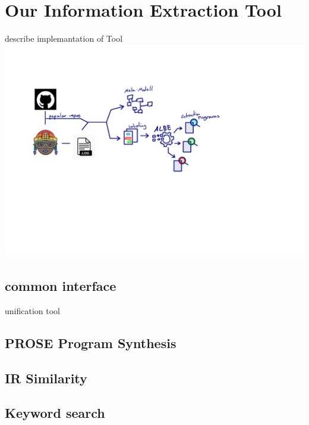 \documentclass[\myrootdir/main.tex]{subfiles}
\begin{document}
\chapter{Our Information Extraction Tool}
\label{implementation}
describe implemantation of Tool
\includegraphics[page=6, width=\textwidth, trim={0.5cm 0.5cm 0.5cm 0.5cm}, clip]{img/flow-of-research.pdf}

\section{common interface} 
unification tool

\section{PROSE Program Synthesis}

\section{IR Similarity}

\section{Keyword search}
\end{document}
